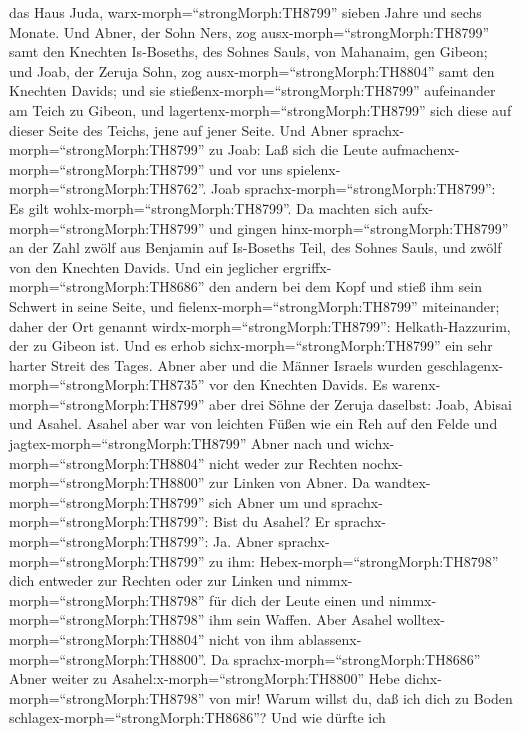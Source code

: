 das Haus Juda, warx-morph=``strongMorph:TH8799'' sieben Jahre und sechs
Monate.  Und Abner, der Sohn Ners, zog
ausx-morph=``strongMorph:TH8799'' samt den Knechten Is-Boseths, des
Sohnes Sauls, von Mahanaim, gen Gibeon;  und Joab, der
Zeruja Sohn, zog ausx-morph=``strongMorph:TH8804'' samt den Knechten
Davids; und sie stießenx-morph=``strongMorph:TH8799'' aufeinander am
Teich zu Gibeon, und lagertenx-morph=``strongMorph:TH8799'' sich diese
auf dieser Seite des Teichs, jene auf jener Seite.  Und
Abner sprachx-morph=``strongMorph:TH8799'' zu Joab: Laß sich die Leute
aufmachenx-morph=``strongMorph:TH8799'' und vor uns
spielenx-morph=``strongMorph:TH8762''. Joab
sprachx-morph=``strongMorph:TH8799'': Es gilt
wohlx-morph=``strongMorph:TH8799''.  Da machten sich
aufx-morph=``strongMorph:TH8799'' und gingen
hinx-morph=``strongMorph:TH8799'' an der Zahl zwölf aus Benjamin auf
Is-Boseths Teil, des Sohnes Sauls, und zwölf von den Knechten Davids.
 Und ein jeglicher ergriffx-morph=``strongMorph:TH8686''
den andern bei dem Kopf und stieß ihm sein Schwert in seine Seite, und
fielenx-morph=``strongMorph:TH8799'' miteinander; daher der Ort genannt
wirdx-morph=``strongMorph:TH8799'': Helkath-Hazzurim, der zu Gibeon ist.
 Und es erhob sichx-morph=``strongMorph:TH8799'' ein sehr
harter Streit des Tages. Abner aber und die Männer Israels wurden
geschlagenx-morph=``strongMorph:TH8735'' vor den Knechten Davids.
 Es warenx-morph=``strongMorph:TH8799'' aber drei Söhne der
Zeruja daselbst: Joab, Abisai und Asahel. Asahel aber war von leichten
Füßen wie ein Reh auf den Felde  und
jagtex-morph=``strongMorph:TH8799'' Abner nach und
wichx-morph=``strongMorph:TH8804'' nicht weder zur Rechten
nochx-morph=``strongMorph:TH8800'' zur Linken von Abner. 
Da wandtex-morph=``strongMorph:TH8799'' sich Abner um und
sprachx-morph=``strongMorph:TH8799'': Bist du Asahel? Er
sprachx-morph=``strongMorph:TH8799'': Ja.  Abner
sprachx-morph=``strongMorph:TH8799'' zu ihm:
Hebex-morph=``strongMorph:TH8798'' dich entweder zur Rechten oder zur
Linken und nimmx-morph=``strongMorph:TH8798'' für dich der Leute einen
und nimmx-morph=``strongMorph:TH8798'' ihm sein Waffen. Aber Asahel
wolltex-morph=``strongMorph:TH8804'' nicht von ihm
ablassenx-morph=``strongMorph:TH8800''.  Da
sprachx-morph=``strongMorph:TH8686'' Abner weiter zu
Asahel:x-morph=``strongMorph:TH8800'' Hebe
dichx-morph=``strongMorph:TH8798'' von mir! Warum willst du, daß ich
dich zu Boden schlagex-morph=``strongMorph:TH8686''? Und wie dürfte ich
